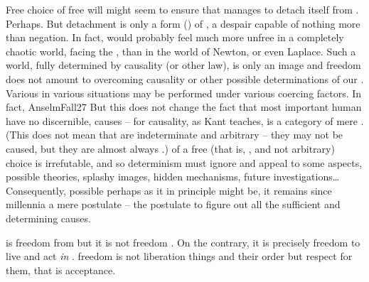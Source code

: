 Free choice of free will might seem to ensure that  manages to detach
itself from . Perhaps. But detachment is only a form
() of , a despair capable of nothing more than
negation.
In fact,  would probably feel much more unfree in a completely chaotic
world, facing the , than in the world of Newton, or
even Laplace.  Such a world, fully determined by causality (or other law), is
only an image and freedom does not amount to overcoming causality or other
possible determinations of our . Various  in various
situations may be performed under various coercing factors. In fact, \citet{[n]o
  one wills what he can will because he can, without some other cause
  [...]}{AnselmFall}{27} But this does not change the fact that most important
human  have no discernible,  causes -- for causality, as
Kant teaches, is a category of mere . (This does not mean that
 are indeterminate and arbitrary -- they may not be caused, but they
are almost always .)   of a free (that is,
, and not arbitrary) choice is irrefutable, and so determinism
must ignore  and appeal to some  aspects, possible
theories, splashy images, hidden mechanisms, future investigations\ldots
Consequently, possible perhaps as it in principle might be, it remains since
millennia a mere postulate -- the postulate to figure out all the sufficient and
determining causes.


\pa %
 is freedom from  but it is not
freedom  . On the contrary, it is precisely
freedom to live and act {\em in} .
 freedom is not liberation  things and their order but
respect for them, that is  acceptance. 

